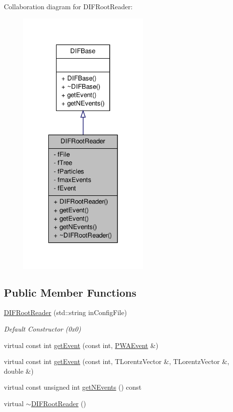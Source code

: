 Collaboration diagram for DIFRootReader:
\nopagebreak
\begin{figure}[H]
\begin{center}
\leavevmode
\includegraphics[width=186pt]{d2/d6b/classDIFRootReader__coll__graph}
\end{center}
\end{figure}
\subsection*{Public Member Functions}
\begin{DoxyCompactItemize}
\item 
\hyperlink{classDIFRootReader_a2780d5277825eb0d3b3ced2c2db05ee4}{DIFRootReader} (std::string inConfigFile)
\begin{DoxyCompactList}\small\item\em Default Constructor (0x0) \end{DoxyCompactList}\item 
virtual const int \hyperlink{classDIFRootReader_a2469dc5451328c7e802f2ff540842082}{getEvent} (const int, \hyperlink{classPWAEvent}{PWAEvent} \&)
\item 
virtual const int \hyperlink{classDIFRootReader_a4d39cf2617a549c0fd6b097be8890756}{getEvent} (const int, TLorentzVector \&, TLorentzVector \&, double \&)
\item 
virtual const unsigned int \hyperlink{classDIFRootReader_a2cee7a677795a26ecef7cdf3129162ab}{getNEvents} () const 
\item 
virtual \hyperlink{classDIFRootReader_a3b2d897442630d757da57a3f2a83f7f3}{$\sim$DIFRootReader} ()
\end{DoxyCompactItemize}
